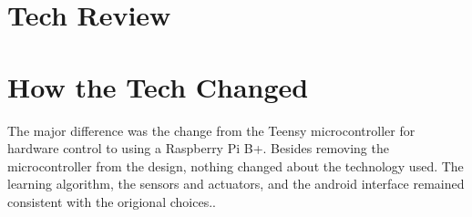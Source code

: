 \section{Tech Review}


\section{How the Tech Changed}
The major difference was the change from the Teensy microcontroller for hardware control to using a Raspberry Pi B+.
Besides removing the microcontroller from the design, nothing changed about the technology used.
The learning algorithm, the sensors and actuators, and the android interface remained consistent with the origional choices..

